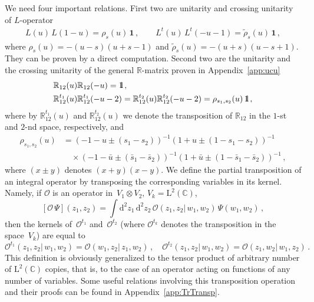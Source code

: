 \documentclass[a4paper,11pt]{article}
\def\II{\hbox{{1}\kern-.25em\hbox{l}}}
\numberwithin{equation}{section}
\begin{document}
We need four important relations. First two are unitarity and crossing unitarity of $L$-operator
\begin{align} \label{Lunitar}
	L(u)\,L(1-u) = \rho_s(u)\,\bm{1} \,, \qquad L^t(u)\,L^t(-u-1) = \tilde{\rho}_s(u)\,\bm{1} \,,
\end{align}
where $\rho_s(u) = -(u-s)(u+s-1)$ and $\tilde{\rho}_s(u) = -(u+s)(u-s+1)$.
They can be proven by a direct computation.
Second two are the unitarity and the crossing unitarity of the general $\mathbb{R}$-matrix proven in Appendix~\ref{app:ucu}
\begin{align}
	& \label{Runi1}
	\mathbb{R}_{12}(u)\mathbb{R}_{12}(-u) = \II \,, \\
	& \label{Rcuni1}
	\mathbb{R}_{12}^{t_1}(u)\mathbb{R}_{12}^{t_1}(-u-2)= \mathbb{R}_{12}^{t_2}(u)\mathbb{R}_{12}^{t_2}(-u-2) = \rho_{s_1,s_2}(u)\,\II \,,
\end{align}
where by $\mathbb{R}_{12}^{t_1}(u)$ and $\mathbb{R}_{12}^{t_2}(u)$ we denote the transposition of $\mathbb{R}_{12}$ in the $1$-st and $2$-nd space, respectively, and
\begin{align}
	\nonumber
	\rho_{s_1,s_2}(u) & = 
	(-1-u\pm(s_1-s_2))^{-1}(1+u\pm(1-s_1-s_2))^{-1} \\
	& \nonumber
	\quad\times
	(-1-\bar{u}\pm(\bar{s}_1-\bar{s}_2))^{-1}(1+\bar{u}\pm(1-\bar{s}_1-\bar{s}_2))^{-1} \,,
\end{align}
where $(x\pm y)$ denotes $(x+y)(x-y)$.
We define the partial transposition of an integral operator by transposing the corresponding variables in its kernel.
Namely, if $\mathcal{O}$ is an operator in~$V_1\otimes V_2, \, V_k = \mathrm{L}^2(\mathbb{C})$,
\begin{equation} \label{transpDef1}
	[\mathcal{O}\,\Psi](z_1,z_2) = \int \mathrm{d}^2z_1\,\mathrm{d}^2z_2 \,
	\mathcal{O}(z_1,z_2|\,w_1,w_2) \, \Psi(w_1,w_2) \,,
\end{equation}
then the kernels of~$\mathcal{O}^{t_1}$ and~$\mathcal{O}^{t_2}$ (where $\mathcal{O}^{t_k}$ denotes the transposition in the space~$V_k$) are equal to
\begin{equation} \label{transpDef2}
	\mathcal{O}^{t_1}(z_1, z_2|\,w_1, w_2) = \mathcal{O}(w_1, z_2|\,z_1, w_2) \,, \quad
	\mathcal{O}^{t_2}(z_1, z_2|\,w_1, w_2) = \mathcal{O}(z_1, w_2|\,w_1, z_2) \,.
\end{equation}
This definition is obviously generalized to the tensor product of arbitrary number of $\mathrm{L}^2(\mathbb{C})$ copies, that is, to the case of an operator acting on functions of any number of variables.
Some useful relations involving this transposition operation and their proofs can be found in Appendix~\ref{app:TrTransp}.
\end{document}

